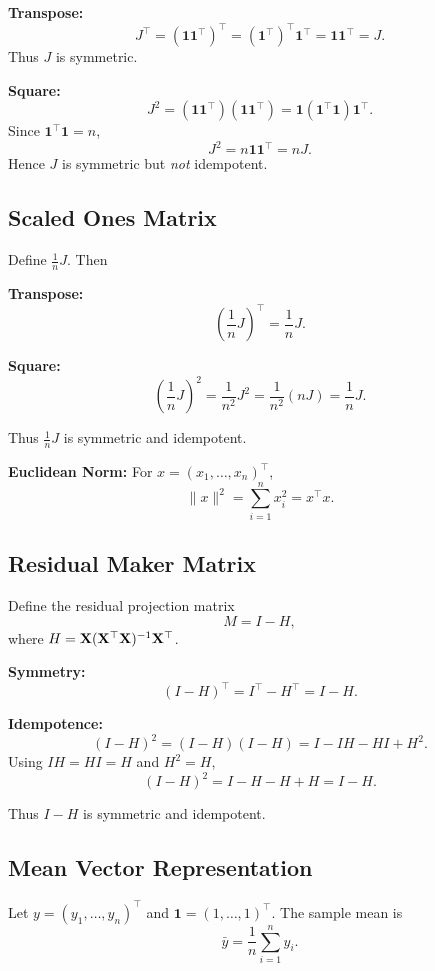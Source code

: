 \textbf{Transpose:}
\[
J^{\top} = (\mathbf{1}\mathbf{1}^{\top})^{\top}
= (\mathbf{1}^{\top})^{\top}\mathbf{1}^{\top}
= \mathbf{1}\mathbf{1}^{\top}
= J.
\]
Thus $J$ is symmetric.

\textbf{Square:}
\[
J^2 = (\mathbf{1}\mathbf{1}^{\top})(\mathbf{1}\mathbf{1}^{\top})
= \mathbf{1}(\mathbf{1}^{\top}\mathbf{1})\mathbf{1}^{\top}.
\]
Since $\mathbf{1}^{\top}\mathbf{1}=n$,
\[
J^2 = n\mathbf{1}\mathbf{1}^{\top} = nJ.
\]
Hence $J$ is symmetric but \emph{not} idempotent.

\subsection{Scaled Ones Matrix}

Define $\frac{1}{n}J$. Then

\textbf{Transpose:}
\[
\left(\frac{1}{n}J\right)^{\top}=\frac{1}{n}J.
\]

\textbf{Square:}
\[
\left(\frac{1}{n}J\right)^2
= \frac{1}{n^2}J^2
= \frac{1}{n^2}(nJ)
= \frac{1}{n}J.
\]

Thus $\frac{1}{n}J$ is symmetric and idempotent.

\begin{notebox}
\textbf{Euclidean Norm:} For $x=(x_1,\dots,x_n)^{\top}$,
\[
\|x\|^2 = \sum_{i=1}^{n}x_i^2 = x^{\top}x.
\]
\end{notebox}

\subsection{Residual Maker Matrix}

Define the residual projection matrix
\[
M = I - H,
\]
where $H = \mathbf{X}(\mathbf{X}^{\top}\mathbf{X})^{-1}\mathbf{X}^{\top}$.

\textbf{Symmetry:}
\[
(I-H)^{\top} = I^{\top} - H^{\top} = I - H.
\]

\textbf{Idempotence:}
\[
(I-H)^2 = (I-H)(I-H) = I - IH - HI + H^2.
\]
Using $IH=HI=H$ and $H^2=H$,
\[
(I-H)^2 = I - H - H + H = I - H.
\]

Thus $I-H$ is symmetric and idempotent.

\subsection{Mean Vector Representation}

Let $y=(y_1,\dots,y_n)^{\top}$ and $\mathbf{1}=(1,\dots,1)^{\top}$. The sample mean is
\[
\bar{y}=\frac{1}{n}\sum_{i=1}^n y_i.
\]

